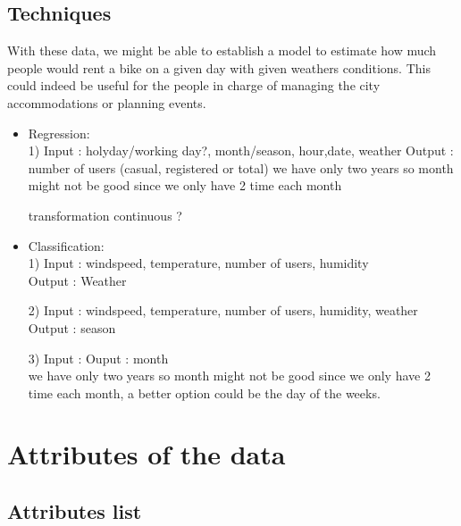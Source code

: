 \documentclass[11pt,a4paper]{article}
\begin{document}
 \subsection{Techniques}
With these data, we might be able to establish a model to estimate how much people would rent a bike on a given day with given weathers conditions. This could indeed be useful for the people in charge of managing the city accommodations or planning events.

\begin{itemize}

\item Regression: \\
 1) Input : holyday/working day?, month/season, hour,date, weather
    Output : number of users (casual, registered or total)
    we have only two years so month might not be good since we only have 2 time each month

    
    transformation continuous ?
    
    \item  Classification: \\
 1) Input : windspeed, temperature, number of users, humidity \\
    Output : Weather
    
 2) Input : windspeed, temperature, number of users, humidity, weather \\
    Output : season
    
 3) Input :
    Ouput : month  \\
    we have only two years so month might not be good since we only have 2 time each month, a better option could be the day of the weeks.
 
\end{itemize}


    
   

    
\section{Attributes of the data}

\subsection{Attributes list}
\end{document}

